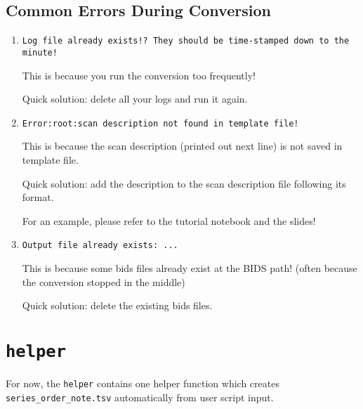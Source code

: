 \documentclass[12pt]{myland}
\def\<#1>{\texttt{#1}}
\begin{document}
    \subsection{Common Errors During Conversion}
    \begin{enumerate}[itemsep=5pt]
        \item \<Log file already exists!?  They should be time-stamped down to the minute!> \par
            This is because you run the conversion too frequently! \par
            \color{red}Quick solution: \color{black}delete all your logs and run it again.

        \item \<Error:root:scan description not found in template file!> \par
            This is because the scan description (printed out next line) is not saved in template file. \par
            \color{red}Quick solution: \color{black}add the description to the scan description file following
            its format. \par
            For an example, please refer to the tutorial notebook and the slides!

        \item \<Output file already exists: ...> \par
            This is because some bids files already exist at the BIDS path! (often because the conversion stopped in
            the middle) \par
            \color{red}Quick solution: \color{black}delete the existing bids files.
    \end{enumerate}


\section{\<helper>}
For now, the \<helper> contains one helper function which creates \<series\_order\_note.tsv> automatically from user 
script input.
\end{document}
